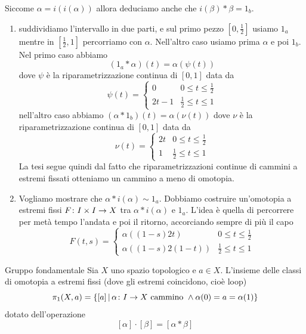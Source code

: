 \documentclass[a4paper]{article}
\begin{document}
Siccome \(\alpha = i(i(\alpha))\) allora deduciamo anche che
\(i(\beta) \ast \beta = 1_b\).

\begin{snippetproof}{}
    \begin{enumerate}
        \item suddividiamo l'intervallo in due parti, e sul primo pezzo
        \([0, \frac12]\) usiamo \(1_a\) mentre in \([\frac12, 1]\)
        percorriamo con \(\alpha\).
        Nell'altro caso usiamo prima \(\alpha\) e poi \(1_b\).
        Nel primo caso abbiamo
        \[
            (1_a \ast \alpha)(t) = \alpha(\psi(t))
        \]
        dove \(\psi\) è la riparametrizzazione continua di \([0,1]\)
        data da 
        \[
            \psi(t) = \begin{cases}
                0 & 0 \leq t \leq \frac12 \\
                2t - 1 & \frac12 \leq t \leq 1
            \end{cases}
        \]
        nell'altro caso abbiamo
        \((\alpha \ast 1_b)(t) = \alpha(\nu(t))\) dove \(\nu\)
        è la riparametrizzazione continua di \([0,1]\) data da
        \[
            \nu(t) = \begin{cases}
                2t & 0 \leq t \leq \frac12 \\
                1 & \frac12 \leq t \leq 1
            \end{cases}
        \]
        La tesi segue quindi dal fatto che
        riparametrizzazioni continue di cammini a estremi fissati
        otteniamo un cammino a meno di omotopia.
        \item Vogliamo mostrare che \(\alpha \ast i(\alpha) \sim 1_a\).
        Dobbiamo costruire un'omotopia a estremi fissi \(F \colon I \times I \to X\)
        tra \(\alpha \ast i(\alpha)\) e \(1_a\).
        L'idea è quella di percorrere per metà tempo l'andata e poi il ritorno,
        accorciando sempre di più il capo
        \[
            F(t,s) = \begin{cases}
                \alpha((1-s)2t) & 0 \leq t \leq \frac12 \\
                \alpha((1-s)2(1-t)) & \frac12 \leq t \leq 1
            \end{cases}
        \]
    \end{enumerate}
\end{snippetproof}

\begin{snippetdefinition}{Gruppo fondamentale}
    Sia \(X\) uno spazio topologico e \(a \in X\).
    L'insieme delle classi di omotopia a estremi fissi (dove gli estremi coincidono, cioè loop)
    \[
        \pi_1(X, a) = \{[a] \,|\, \alpha \colon I \to X \text{ cammino } \land \alpha(0) = a = \alpha(1)\}
    \]
    dotato dell'operazione
    \[
        [\alpha] \cdot [\beta] = [\alpha \ast \beta]
    \]
\end{snippetdefinition}
\end{document}

